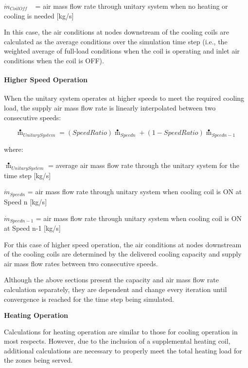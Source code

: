 \({\dot m_{CoilOff}}\) ~ = air mass flow rate through unitary system when no heating or cooling is needed {[}kg/s{]}

In this case, the air conditions at nodes downstream of the cooling coils are calculated as the average conditions over the simulation time step (i.e., the weighted average of full-load conditions when the coil is operating and inlet air conditions when the coil is OFF).

\paragraph{Higher Speed Operation}\label{higher-speed-operation}

When the unitary system operates at higher speeds to meet the required cooling load, the supply air mass flow rate is linearly interpolated between two consecutive speeds:

\begin{equation}
{{\mathop m\limits^ \bullet  }_{UnitarySystem}} = \left( {SpeedRatio} \right){{\mathop m\limits^ \bullet  }_{Speedn}} + \left( {1 - SpeedRatio} \right){{\mathop m\limits^ \bullet  }_{Speedn - 1}}
\end{equation}

where:

\({{\mathop m\limits^ \bullet }_{UnitarySystem}}\) = average air mass flow rate through the unitary system for the time step {[}kg/s{]}

\({\dot m_{Speedn}}\) = air mass flow rate through unitary system when cooling coil is ON at Speed n {[}kg/s{]}

\({\dot m_{Speedn - 1}}\) = air mass flow rate through unitary system when cooling coil is ON at Speed n-1 {[}kg/s{]}

For this case of higher speed operation, the air conditions at nodes downstream of the cooling coils are determined by the delivered cooling capacity and supply air mass flow rates between two consecutive speeds.

Although the above sections present the capacity and air mass flow rate calculation separately, they are dependent and change every iteration until convergence is reached for the time step being simulated.

\textbf{Heating Operation}

Calculations for heating operation are similar to those for cooling operation in most respects. However, due to the inclusion of a supplemental heating coil, additional calculations are necessary to properly meet the total heating load for the zones being served.

